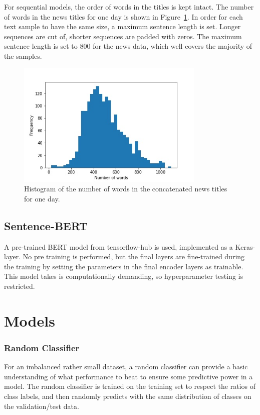 For sequential models, the order of words in the titles is kept intact. The number of words in the news titles for one day is shown in Figure~\ref{fig:num_words}. In order for each text sample to have the same size, a maximum sentence length is set. Longer sequences are cut of, shorter sequences are padded with zeros. The maximum sentence length is set to 800 for the news data, which well covers the majority of the samples. 

\begin{figure}[h]
\centering
\includegraphics[width=0.8\textwidth]{Figures/wordcount.jpg}
\caption{Histogram of the number of words in the concatenated news titles for one day. }
\label{fig:num_words}
\end{figure}

\subsection{Sentence-BERT}

A pre-trained BERT model from tensorflow-hub is used, implemented as a Keras-layer. No pre training is performed, but the final layers are fine-trained during the training by setting the parameters in the final encoder layers as trainable. This model takes is computationally demanding, so hyperparameter testing is restricted. 



\section{Models}

\subsubsection*{Random Classifier}

For an imbalanced rather small dataset, a random classifier can provide a basic understanding of what performance to beat to ensure some predictive power in a model. The random classifier is trained on the training set to respect the ratios of class labels, and then randomly predicts with the same distribution of classes on the validation/test data. 

